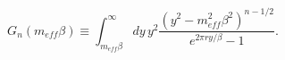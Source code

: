 \begin{equation}
G_{n}\left(m_{eff}\beta \right)\equiv \int _{m_{eff}\beta }^{\infty }dy\, y^{2}\frac{\left(y^{2}-m_{eff}^{2}\beta ^{2}\right)^{n-1/2}}{e^{2\pi ry/\beta }-1}.\end{equation}

